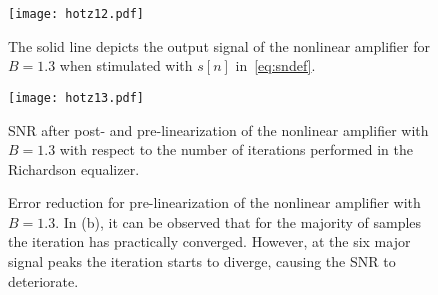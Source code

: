 \documentclass[10pt,twocolumn,twoside]{IEEEtran}
\begin{document}
\begin{figure}[!t]\centering \texttt{[image: hotz12.pdf]}\caption{The solid line depicts the output signal of the nonlinear
	amplifier for $B=1.3$ when stimulated with $s[n]$ in~\eqref{eq:sndef}.}\label{fig:inoutcmpb130}\end{figure}\begin{figure}[!t]\centering \texttt{[image: hotz13.pdf]}\caption{SNR after post- and pre-linearization of the nonlinear amplifier with $B=1.3$
	with respect to the number of iterations performed in the Richardson equalizer.}\label{fig:snrb130}\end{figure}
\begin{figure}[!t]\centering {}\hfil {}\caption{Error reduction for pre-linearization of the nonlinear amplifier with $B=1.3$.
	In (b), it can be observed that for the majority of samples the iteration has
	practically converged. However, at the six major signal peaks the iteration
	starts to diverge, causing the SNR to deteriorate.}\label{fig:errorreductionpreb130}\end{figure}
\end{document}
